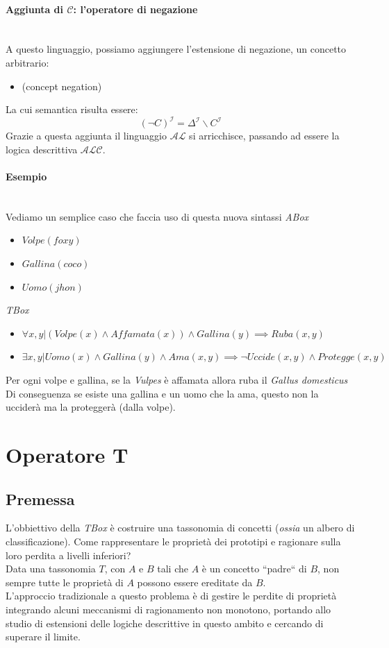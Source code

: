 \paragraph{Aggiunta di $\mathcal{C}$: l’operatore di negazione} \hfill \\
A questo linguaggio, possiamo aggiungere l’estensione di negazione, un concetto arbitrario:
\begin{itemize}
	\item[]  (concept negation)
\end{itemize}
La cui semantica risulta essere:
\[ (\neg C)^{\mathcal{I}} =  \Delta^{\mathcal{I}}\backslash C^{\mathcal{I}}\]
Grazie a questa aggiunta il linguaggio $ \mathcal{AL} $ si arricchisce, 
passando ad essere la logica descrittiva $ \mathcal{ALC} $.
\paragraph{Esempio} \hfill
\\
Vediamo un semplice caso che faccia uso di questa nuova sintassi 
\textit{ABox}
\begin{itemize}
	\item $ Volpe(foxy)$
	\item $ Gallina(coco) $
	\item $ Uomo(jhon) $
\end{itemize}
\textit{TBox}
\begin{itemize}
	\item $ \forall x,y |(Volpe(x) \land \textit{Affamata}(x)) \land Gallina(y)  \implies Ruba(x,y) $
	\item $ \exists x,y |Uomo(x) \land Gallina(y) \land Ama(x,y) \implies \neg Uccide(x,y) \land Protegge(x,y) $
\end{itemize}
Per ogni volpe e gallina, se la \textit{Vulpes} è affamata allora ruba il \textit{Gallus domesticus}
Di conseguenza se esiste una gallina e un uomo che la ama, questo non la ucciderà ma la proteggerà (dalla volpe).

\section{Operatore T}
\subsection{Premessa}
L'obbiettivo della \textit{TBox} è costruire una tassonomia di concetti (\textit{ossia} un albero di classificazione). 
Come rappresentare le proprietà dei prototipi e ragionare sulla loro perdita a livelli inferiori? \\
Data una tassonomia $T$, con $A$ e $B$ tali che $A$ è un concetto “padre“ di $B$, 
non sempre tutte le proprietà di $A$ possono essere ereditate da $B$.\\
L’approccio tradizionale a questo problema è di gestire le perdite di proprietà 
integrando alcuni meccanismi di ragionamento non monotono, portando allo studio di estensioni 
delle logiche descrittive in questo ambito e cercando di superare il limite.

